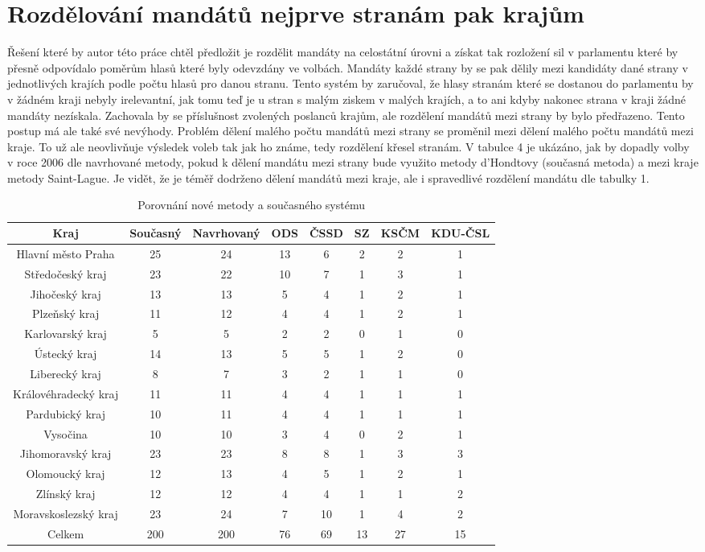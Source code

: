 \documentclass[12pt]{report}
\begin{document}
\section{Rozdělování mandátů nejprve stranám pak krajům} Řešení které by autor této práce chtěl předložit je rozdělit mandáty na celostátní úrovni a získat tak rozložení sil v parlamentu které by přesně odpovídalo poměrům hlasů které byly odevzdány ve volbách.
Mandáty každé strany by se pak dělily mezi kandidáty dané strany v jednotlivých krajích podle počtu hlasů pro danou stranu.
Tento systém by zaručoval, že hlasy stranám které se dostanou do parlamentu by v žádném kraji nebyly irelevantní, jak tomu teď je u stran s malým ziskem v malých krajích, a to ani kdyby nakonec strana v kraji žádné mandáty nezískala.
Zachovala by se příslušnost zvolených poslanců krajům, ale  rozdělení mandátů mezi strany by bylo předřazeno.
Tento postup má ale také své nevýhody.
Problém dělení malého počtu mandátů mezi strany se proměnil mezi dělení malého počtu mandátů mezi kraje.
To už ale neovlivňuje výsledek voleb tak jak ho známe, tedy rozdělení křesel stranám.
V tabulce 4 je ukázáno, jak by dopadly volby v roce 2006 dle navrhované metody, pokud k dělení mandátu mezi strany bude využito metody d'Hondtovy (současná metoda) a mezi kraje metody Saint-Lague. Je vidět, že je téměř dodrženo dělení mandátů mezi kraje, ale i spravedlivé rozdělení mandátu dle tabulky 1. 
\begin{table} \begin{tabular}{|c|c|c|c|c|c|c|c|} 
\hline Kraj & Současný & Navrhovaný & ODS & ČSSD & SZ & KSČM & KDU-ČSL \\
\hline Hlavní město Praha & 25 & 24 & 13 & 6 & 2 & 2 & 1 \\
\hline Středočeský kraj & 23 & 22 & 10 & 7 & 1 & 3 & 1 \\
\hline Jihočeský kraj & 13 & 13 & 5 & 4 & 1 & 2 & 1 \\
\hline Plzeňský kraj & 11 & 12 & 4 & 4 & 1 & 2 & 1 \\
\hline Karlovarský kraj & 5 & 5 & 2 & 2 & 0 & 1 & 0 \\
\hline Ústecký kraj & 14 & 13 & 5 & 5 & 1 & 2 & 0 \\
\hline Liberecký kraj & 8 & 7 & 3 & 2 & 1 & 1 & 0 \\
\hline Královéhradecký kraj & 11 & 11 & 4 & 4 & 1 & 1 & 1 \\
\hline Pardubický kraj & 10 & 11 & 4 & 4 & 1 & 1 & 1 \\
\hline Vysočina & 10 & 10 & 3 & 4 & 0 & 2 & 1 \\
\hline Jihomoravský kraj & 23 & 23 & 8 & 8 & 1 & 3 & 3 \\
\hline Olomoucký kraj & 12 & 13 & 4 & 5 & 1 & 2 & 1 \\
\hline Zlínský kraj & 12 & 12 & 4 & 4 & 1 & 1 & 2 \\
\hline Moravskoslezský kraj & 23 & 24 & 7 & 10 & 1 & 4 & 2 \\
\hline Celkem & 200 & 200 & 76 & 69 & 13 & 27 & 15 \\
\hline \end{tabular} \caption{Porovnání nové metody a současného systému} \end{table}
\end{document}
